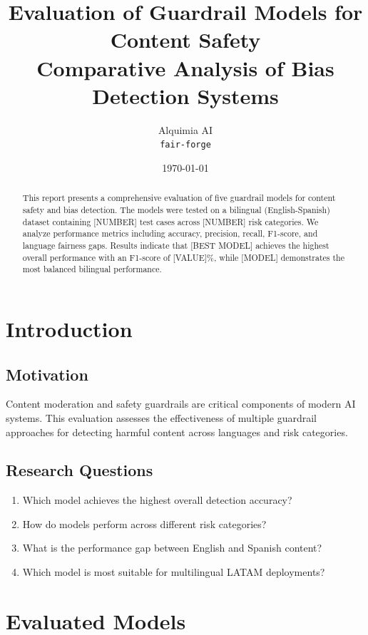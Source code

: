 \documentclass[11pt,a4paper]{article}
\title{
    \textbf{Evaluation of Guardrail Models for Content Safety}\\
    \large Comparative Analysis of Bias Detection Systems
}
\author{
    Alquimia AI\\
    \texttt{fair-forge}
}
\date{\today}
\begin{document}
\maketitle

\begin{abstract}
This report presents a comprehensive evaluation of five guardrail models for content safety and bias detection. The models were tested on a bilingual (English-Spanish) dataset containing [NUMBER] test cases across [NUMBER] risk categories. We analyze performance metrics including accuracy, precision, recall, F1-score, and language fairness gaps. Results indicate that [BEST MODEL] achieves the highest overall performance with an F1-score of [VALUE]\%, while [MODEL] demonstrates the most balanced bilingual performance.
\end{abstract}

\tableofcontents
\newpage

\section{Introduction}

\subsection{Motivation}
Content moderation and safety guardrails are critical components of modern AI systems. This evaluation assesses the effectiveness of multiple guardrail approaches for detecting harmful content across languages and risk categories.

\subsection{Research Questions}
\begin{enumerate}
    \item Which model achieves the highest overall detection accuracy?
    \item How do models perform across different risk categories?
    \item What is the performance gap between English and Spanish content?
    \item Which model is most suitable for multilingual LATAM deployments?
\end{enumerate}

\section{Evaluated Models}
\end{document}
